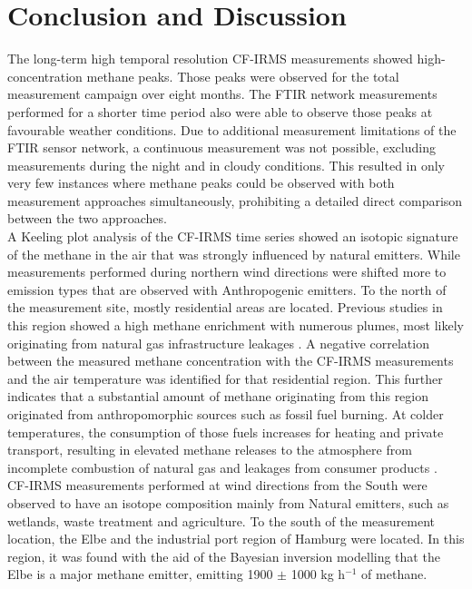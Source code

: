 \chapter{Conclusion and Discussion}
\label{chap:ConAndDis}

The long-term high temporal resolution CF-IRMS measurements showed high-concentration methane peaks. Those peaks were observed for the total measurement campaign over eight months. The FTIR network measurements performed for a shorter time period also were able to observe those peaks at favourable weather conditions. Due to additional measurement limitations of the FTIR sensor network, a continuous measurement was not possible, excluding measurements during the night and in cloudy conditions. This resulted in only very few instances where methane peaks could be observed with both measurement approaches simultaneously, prohibiting a detailed direct comparison between the two approaches.\\
A Keeling plot analysis of the CF-IRMS time series showed an isotopic signature of the methane in the air that was strongly influenced by natural emitters. While measurements performed during northern wind directions were shifted more to emission types that are observed with Anthropogenic emitters. To the north of the measurement site, mostly residential areas are located. Previous studies in this region showed a high methane enrichment with numerous plumes, most likely originating from natural gas infrastructure leakages \cite{Maazallahi.2020}. A negative correlation between the measured methane concentration with the CF-IRMS measurements and the air temperature was identified for that residential region. This further indicates that a substantial amount of methane originating from this region originated from anthropomorphic sources such as fossil fuel burning. At colder temperatures, the consumption of those fuels increases for heating and private transport, resulting in elevated methane releases to the atmosphere from incomplete combustion of natural gas and leakages from consumer products \cite{Lebel.2022}.\\
CF-IRMS measurements performed at wind directions from the South were observed to have an isotope composition mainly from Natural emitters, such as wetlands, waste treatment and agriculture. To the south of the measurement location, the Elbe and the industrial port region of Hamburg were located. In this region, it was found with the aid of the Bayesian inversion modelling that the Elbe is a major methane emitter, emitting 1900 $\pm$ 1000  kg h$^{-1}$ of methane. \\

